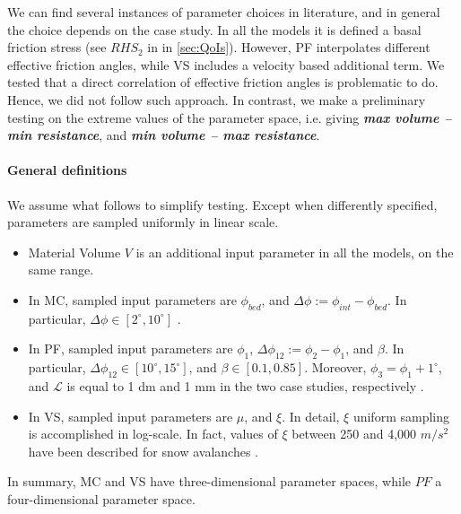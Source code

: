\documentclass{article}
\begin{document}
We can find several instances of parameter choices in literature, and in general the choice depends on the case study. In all the models it is defined a basal friction stress (see $RHS_2$ in in \ref{sec:QoIs}). However, PF interpolates different effective friction angles, while VS includes a velocity based additional term. We tested that a direct correlation of effective friction angles is problematic to do. Hence, we did not follow such approach. In contrast, we make a preliminary testing on the extreme values of the parameter space, i.e. giving \emph{\textbf{max volume -- min resistance}}, and \emph{\textbf{min volume -- max resistance}}.

\paragraph{General definitions}
We assume what follows to simplify testing. Except when differently specified, parameters are sampled uniformly in linear scale.
\begin{itemize}
\item Material Volume $V$ is an additional input parameter in all the models, on the same range.

\item In MC, sampled input parameters are $\phi_{bed}$, and $\Delta \phi:=\phi_{int}-\phi_{bed}$. In particular, $\Delta \phi \in [2^{\mathrm{\circ}}, 10^{\mathrm{\circ}}]$ \citep{Dalbey2008}.

\item In PF, sampled input parameters are $\phi_1$, $\Delta \phi_{12}:=\phi_2-\phi_1$, and $\beta$. In particular, $\Delta \phi_{12} \in [10^{\mathrm{\circ}}, 15^{\mathrm{\circ}}]$, and $\beta \in [0.1, 0.85]$. Moreover, $\phi_3=\phi_1+1^\mathrm{\circ}$, and $\mathcal{L}$ is equal to 1 dm and 1 mm in the two case studies, respectively \citep{PouliquenForterre2002,ForterrePouliquen2003,Gray2014, Barker2015}.

\item In VS, sampled input parameters are $\mu$, and $\xi$. In detail, $\xi$ uniform sampling is accomplished in log-scale. In fact, values of $\xi$ between 250 and 4,000 $m/s^2$ have been described for snow avalanches \citep{Salm1993,Bartelt1999,Gruber2007}.
\end{itemize}
In summary, MC and VS have three-dimensional parameter spaces, while $PF$ a four-dimensional parameter space.

\newpage
\end{document}
